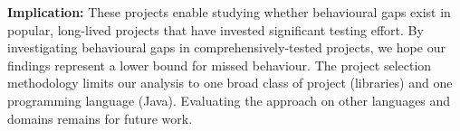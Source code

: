 \smallskip
\noindent\textbf{Implication:} 
These projects enable studying whether behavioural gaps exist in popular, long-lived projects that have invested significant testing effort.
By investigating behavioural gaps in comprehensively-tested projects, we hope our findings represent a lower bound for missed behaviour.
The project selection methodology limits our analysis to one broad class of project (libraries) and one 
programming language (Java). 
Evaluating the approach on other languages and domains remains for future work.

